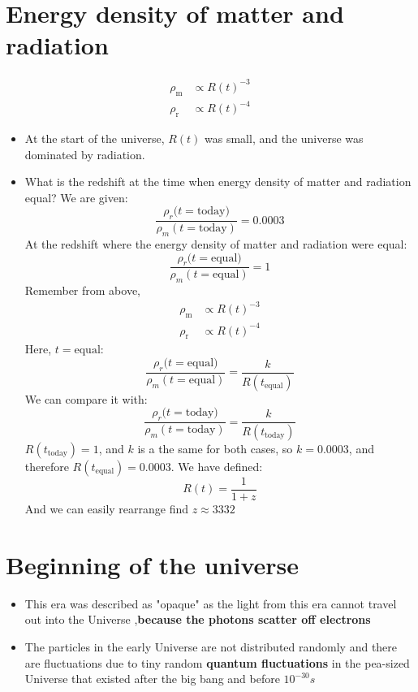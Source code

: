 \documentclass{article}
\begin{document}
\section{Energy density of matter and radiation}
\begin{align}
\rho_\text{m} &\propto {R(t)}^{-3}\\
\rho_\text{r} &\propto {R(t)}^{-4}
\end{align}
\begin{itemize}
\item At the start of the universe, $R(t)$ was small, and the universe was dominated by radiation.
\item What is the redshift at the time when energy density of matter and radiation equal? We are given:
\begin{equation}
    \frac{\rho_r(t=\text{today)}}{\rho_m(t=\text{today})}=0.0003
\end{equation}
At the redshift where the energy density of matter and radiation were equal:
\begin{equation}
 \frac{\rho_r(t=\text{equal)}}{\rho_m(t=\text{equal})}=1
\end{equation}
Remember from above,
\begin{align}
    \rho_\text{m} &\propto {R(t)}^{-3}\\
    \rho_\text{r} &\propto {R(t)}^{-4}
\end{align}
Here, $t=\text{equal}$:
\begin{equation}
\frac{\rho_r(t=\text{equal)}}{\rho_m(t=\text{equal})}=\frac{k}{R(t_\text{equal})}
\end{equation}
We can compare it with:
\begin{equation}
\frac{\rho_r(t=\text{today)}}{\rho_m(t=\text{today})}=\frac{k}{R(t_\text{today})}
\end{equation}
$R(t_\text{today})=1$, and $k$ is a the same for both cases, so $k=0.0003$, and therefore $R(t_\text{equal})=0.0003$.
We have defined:
\begin{equation}
    R(t)=\frac{1}{1+z}
\end{equation}
And we can easily rearrange find $z \approx 3332$
\end{itemize}
\section{Beginning of the universe}
\begin{itemize}
\item This era was described as "opaque" as the light from this era cannot travel out into the Universe ,\textbf{because the photons scatter off electrons}
\item The particles in the early Universe are not distributed randomly and
there are fluctuations due to tiny random \textbf{quantum fluctuations}
in the pea-sized Universe that existed after the big bang and before $10^{-30}s$
\end{itemize}
\end{document}
